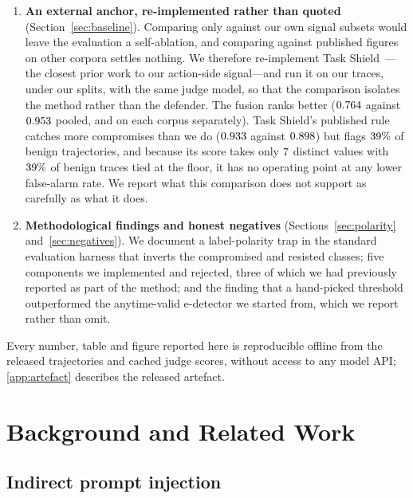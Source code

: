 \documentclass[preprint,12pt,authoryear]{elsarticle}
\theoremstyle{definition}
\begin{document}
\begin{enumerate}
\item \textbf{An external anchor, re-implemented rather than quoted}
(Section~\ref{sec:baseline}). Comparing only against our own signal subsets would
leave the evaluation a self-ablation, and comparing against published figures on
other corpora settles nothing. We therefore re-implement Task
Shield~\citep{jia2024taskshield}---the closest prior work to our action-side
signal---and run it on our traces, under our splits, with the same judge model, so
that the comparison isolates the method rather than the defender. The fusion ranks
better ($0.764$ against $0.953$ pooled, and on each corpus
separately). Task Shield's published rule catches more compromises than we do
($0.933$ against $0.898$) but flags $39\%$ of benign
trajectories, and because its score takes only $7$ distinct values
with $39\%$ of benign traces tied at the floor, it has no operating
point at any lower false-alarm rate. We report what this comparison does not
support as carefully as what it does.

\item \textbf{Methodological findings and honest negatives}
(Sections~\ref{sec:polarity} and~\ref{sec:negatives}). We document a
label-polarity trap in the standard evaluation harness that inverts the
compromised and resisted classes; five components we implemented and rejected,
three of which we had previously reported as part of the method; and the finding
that a hand-picked threshold outperformed the anytime-valid e-detector we
started from, which we report rather than omit.
\end{enumerate}

Every number, table and figure reported here is reproducible offline from the
released trajectories and cached judge scores, without access to any model API;
\ref{app:artefact} describes the released artefact.

\section{Background and Related Work}\label{sec:related}

\subsection{Indirect prompt injection}
\end{document}
